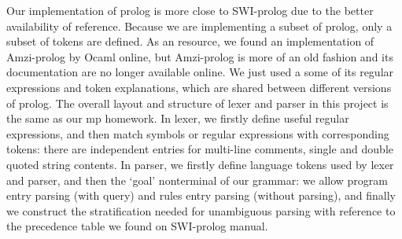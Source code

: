 Our implementation of prolog is more close to SWI-prolog due to the better availability of reference. Because we are implementing a subset of prolog, only a subset of tokens are defined. As an resource, we found an implementation of Amzi-prolog by Ocaml online\cite{gitcode}, but Amzi-prolog is more of an old fashion and its documentation are no longer available online. We just used a some of its regular expressions and token explanations, which are shared between different versions of prolog.
The overall layout and structure of lexer and parser in this project is the same as our mp homework. In lexer, we firstly define useful regular expressions, and then match symbols or regular expressions with corresponding tokens: there are independent entries for multi-line comments, single and double quoted string contents. In parser, we firstly define language tokens used by lexer and parser, and then the `goal' nonterminal of our grammar: we allow program entry parsing (with query) and rules entry parsing (without parsing), and finally we construct the stratification needed for unambiguous parsing with reference to the precedence table we found on SWI-prolog manual.

